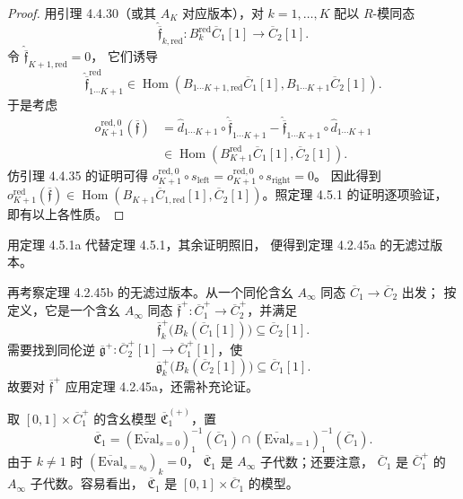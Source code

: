 \begin{proof}
用引理 4.4.30（或其 $A_K$ 对应版本），对
$k=1,\ldots,K$ 配以 $R$-模同态
\[
 \widehat{\overline{\mathfrak f}}_{k,\mathrm{red}}\colon
 B_k^{\mathrm{red}}\overline C_1[1]
 \longrightarrow\overline C_2[1].
\]
令 $\widehat{\overline{\mathfrak f}}_{K+1,\mathrm{red}}=0$，
它们诱导
\[
 \widehat{\overline{\mathfrak f}}^{\mathrm{red}}_{1\cdots K+1}
 \in\operatorname{Hom}
 (B_{1\cdots K+1,\mathrm{red}}\overline C_1[1],
  B_{1\cdots K+1}\overline C_2[1]).
\]
于是考虑
\[
 \begin{aligned}
 o^{\mathrm{red},0}_{K+1}(\overline{\mathfrak f})
 &=
 \widehat d_{1\cdots K+1}\circ
 \widehat{\overline{\mathfrak f}}_{1\cdots K+1}
 -
 \widehat{\overline{\mathfrak f}}_{1\cdots K+1}
 \circ\widehat d_{1\cdots K+1}\\
 &\in\operatorname{Hom}
 (B_{K+1}^{\mathrm{red}}\overline C_1[1],
  \overline C_2[1]).
 \end{aligned}
\]
仿引理 4.4.35 的证明可得
$o^{\mathrm{red},0}_{K+1}\circ s_{\mathrm{left}}
=o^{\mathrm{red},0}_{K+1}\circ s_{\mathrm{right}}=0$。
因此得到
$o^{\mathrm{red}}_{K+1}(\overline{\mathfrak f})
\in\operatorname{Hom}
(B_{K+1}\overline C_{1,\mathrm{red}}[1],
\overline C_2[1])$。照定理 4.5.1 的证明逐项验证，
即有以上各性质。
\end{proof}

用定理 4.5.1a 代替定理 4.5.1，其余证明照旧，
便得到定理 4.2.45a 的无滤过版本。

再考察定理 4.2.45b 的无滤过版本。从一个同伦含幺
$A_\infty$ 同态 $\overline C_1\to\overline C_2$ 出发；
按定义，它是一个含幺 $A_\infty$ 同态
$\overline{\mathfrak f}^{+}\colon
\overline C_1^{+}\to\overline C_2^{+}$，并满足
\begin{equation}
 \overline{\mathfrak f}^{+}_k
 \bigl(B_k(\overline C_1[1])\bigr)
 \subseteq\overline C_2[1].
\tag{4.5.11}\label{eq:4-5-11}
\end{equation}
需要找到同伦逆
$\overline{\mathfrak g}^{+}\colon
\overline C_2^{+}[1]\to\overline C_1^{+}[1]$，使
\begin{equation}
 \overline{\mathfrak g}^{+}_k
 \bigl(B_k(\overline C_2[1])\bigr)
 \subseteq\overline C_1[1].
\tag{4.5.12}\label{eq:4-5-12}
\end{equation}
故要对
$\overline{\mathfrak f}^{+}$
应用定理 4.2.45a，还需补充论证。

取 $[0,1]\times\overline C_1^{+}$ 的含幺模型
$\overline{\mathfrak C}_1^{(+)}$，置
\begin{equation}
 \overline{\mathfrak C}_1
 =
 (\overline{\mathrm{Eval}}_{s=0})_1^{-1}
 (\overline C_1)
 \cap
 (\overline{\mathrm{Eval}}_{s=1})_1^{-1}
 (\overline C_1).
\tag{4.5.13}\label{eq:4-5-13}
\end{equation}
由于 $k\ne1$ 时
$(\overline{\mathrm{Eval}}_{s=s_0})_k=0$，
$\overline{\mathfrak C}_1$ 是
$A_\infty$ 子代数；还要注意，
$\overline C_1$ 是 $\overline C_1^+$ 的
$A_\infty$ 子代数。容易看出，
$\overline{\mathfrak C}_1$ 是
$[0,1]\times\overline C_1$ 的模型。

